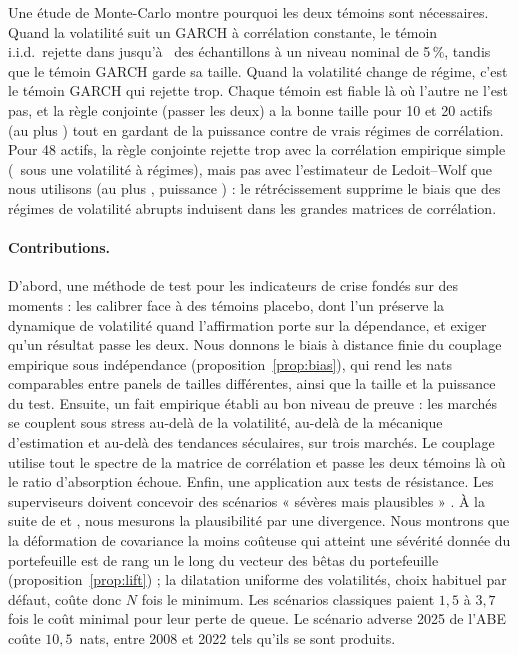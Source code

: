 \documentclass[12pt]{article}
\theoremstyle{definition}
\begin{document}
\begin{doublespace}
Une étude de Monte-Carlo montre pourquoi les deux témoins sont nécessaires.
Quand la volatilité suit un GARCH à corrélation constante, le témoin i.i.d.\
rejette dans jusqu'à \mcIidWorst\ des échantillons à un niveau nominal de
5\,\%, tandis que le témoin GARCH garde sa taille. Quand la volatilité change
de régime, c'est le témoin GARCH qui rejette trop. Chaque témoin est fiable là
où l'autre ne l'est pas, et la règle conjointe (passer les deux) a la bonne
taille pour 10 et 20 actifs (au plus \mcBothWorstSmallN) tout en gardant de la
puissance contre de vrais régimes de corrélation. Pour 48 actifs, la règle
conjointe rejette trop avec la corrélation empirique simple
(\mcSampleMsvolBothFortyEight\ sous une volatilité à régimes), mais pas avec
l'estimateur de Ledoit--Wolf que nous utilisons (au plus \mcLwBothWorst,
puissance \mcLwPow) : le rétrécissement supprime le biais que des régimes de
volatilité abrupts induisent dans les grandes matrices de corrélation.

\paragraph{Contributions.} D'abord, une méthode de test pour les indicateurs
de crise fondés sur des moments : les calibrer face à des témoins placebo,
dont l'un préserve la dynamique de volatilité quand l'affirmation porte sur la
dépendance, et exiger qu'un résultat passe les deux. Nous donnons le biais
à distance finie du couplage empirique sous indépendance
(proposition~\ref{prop:bias}), qui rend les nats comparables entre panels de
tailles différentes, ainsi que la taille et la puissance du test. Ensuite, un
fait empirique établi au bon niveau de preuve : les marchés se couplent sous
stress au-delà de la volatilité, au-delà de la mécanique d'estimation et
au-delà des tendances séculaires, sur trois marchés. Le couplage utilise tout
le spectre de la matrice de corrélation et passe les deux témoins là où le
ratio d'absorption échoue. Enfin, une application aux tests
de résistance. Les superviseurs doivent concevoir des scénarios « sévères
mais plausibles » \citep{bcbs2018}. À la suite de
\citet{breuer2009,breuer2013} et \citet{glasserman2014}, nous mesurons la
plausibilité par une divergence. Nous montrons que la déformation de
covariance la moins coûteuse qui atteint une sévérité donnée du portefeuille
est de rang un le long du vecteur des bêtas du portefeuille
(proposition~\ref{prop:lift}) ; la dilatation uniforme des volatilités, choix
habituel par défaut, coûte donc $N$ fois le minimum. Les scénarios classiques
paient $1{,}5$ à $3{,}7$ fois le coût minimal pour leur perte de queue. Le
scénario adverse 2025 de l'ABE coûte $10{,}5$~nats, entre 2008 et 2022 tels
qu'ils se sont produits.


\end{doublespace}
\end{document}
